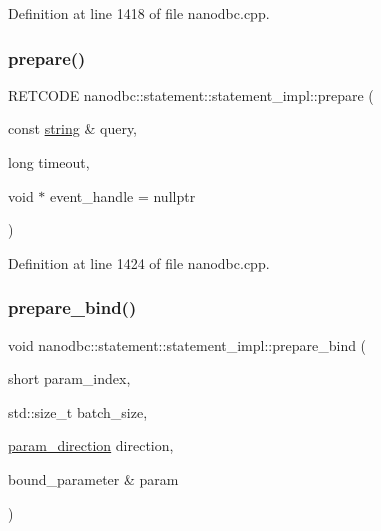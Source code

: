 Definition at line 1418 of file nanodbc.\+cpp.

\mbox{\label{classnanodbc_1_1statement_1_1statement__impl_aaacfabb5338b374f88562d9b874cc74a}} 
\subsubsection{\texorpdfstring{prepare()}{prepare()}\hspace{0.1cm}{\footnotesize\ttfamily [2/2]}}
{\footnotesize\ttfamily R\+E\+T\+C\+O\+DE nanodbc\+::statement\+::statement\+\_\+impl\+::prepare (\begin{DoxyParamCaption}\item[{const \mbox{\hyperlink{namespacenanodbc_abfc0ece56278e590911ec8352774c212}{string}} \&}]{query,  }\item[{long}]{timeout,  }\item[{void $\ast$}]{event\+\_\+handle = {\ttfamily nullptr} }\end{DoxyParamCaption})\hspace{0.3cm}{\ttfamily [inline]}}



Definition at line 1424 of file nanodbc.\+cpp.

\mbox{\label{classnanodbc_1_1statement_1_1statement__impl_a25e6e41813daf5bf2c19add2b5acbf9b}} 
\subsubsection{\texorpdfstring{prepare\_bind()}{prepare\_bind()}}
{\footnotesize\ttfamily void nanodbc\+::statement\+::statement\+\_\+impl\+::prepare\+\_\+bind (\begin{DoxyParamCaption}\item[{short}]{param\+\_\+index,  }\item[{std\+::size\+\_\+t}]{batch\+\_\+size,  }\item[{\mbox{\hyperlink{classnanodbc_1_1statement_a523142f53cbbee8d68a074da993e7fa6}{param\+\_\+direction}}}]{direction,  }\item[{bound\+\_\+parameter \&}]{param }\end{DoxyParamCaption})\hspace{0.3cm}{\ttfamily [inline]}}



